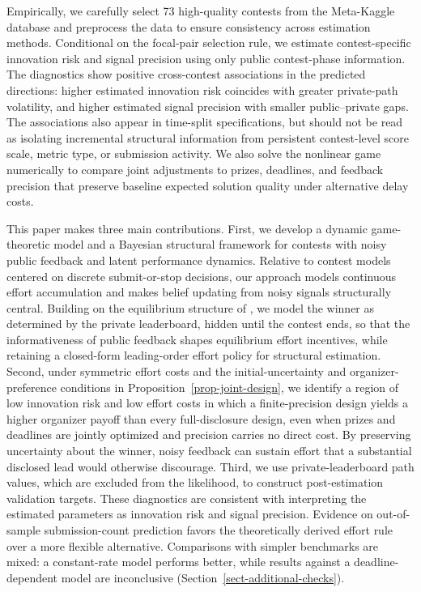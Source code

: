 \documentclass[mnsc]{informs3}
\begin{document}
Empirically, we carefully select 73 high-quality contests from the Meta-Kaggle database and preprocess the data to ensure consistency across estimation methods.
Conditional on the focal-pair selection rule, we estimate contest-specific innovation risk and signal precision using only public contest-phase information.
The diagnostics show positive cross-contest associations in the predicted directions: higher estimated innovation risk coincides with greater private-path volatility, and higher estimated signal precision with smaller public--private gaps. The associations also appear in time-split specifications, but should not be read as isolating incremental structural information from persistent contest-level score scale, metric type, or submission activity.
We also solve the nonlinear game numerically to compare joint adjustments to prizes, deadlines, and feedback precision that preserve baseline expected solution quality under alternative delay costs.


This paper makes three main contributions.
First, we develop a dynamic game-theoretic model and a Bayesian structural framework for contests with noisy public feedback and latent performance dynamics.
Relative to contest models centered on discrete submit-or-stop decisions, our approach models continuous effort accumulation and makes belief updating from noisy signals structurally central.
Building on the equilibrium structure of \citet{Ryvkin2022Fight}, we model the winner as determined by the private leaderboard, hidden until the contest ends, so that the informativeness of public feedback shapes equilibrium effort incentives, while retaining a closed-form leading-order effort policy for structural estimation.
{Second, under symmetric effort costs and the initial-uncertainty and organizer-preference conditions in Proposition~\ref{prop-joint-design}, we identify a region of low innovation risk and low effort costs in which a finite-precision design yields a higher organizer payoff than every full-disclosure design, even when prizes and deadlines are jointly optimized and precision carries no direct cost.} By preserving uncertainty about the winner, noisy feedback can sustain effort that a substantial disclosed lead would otherwise discourage.
Third, we use private-leaderboard path values, which are excluded from the likelihood, to construct post-estimation validation targets.
These diagnostics are consistent with interpreting the estimated parameters as innovation risk and signal precision. Evidence on out-of-sample submission-count prediction favors the theoretically derived effort rule over a more flexible alternative. Comparisons with simpler benchmarks are mixed: a constant-rate model performs better, while results against a deadline-dependent model are inconclusive (Section~\ref{sect-additional-checks}).
\end{document}
